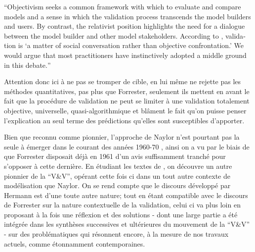 \foreignquote{english}{Objectivism seeks a common framework with which to evaluate and compare models and a sense in which the validation process transcends the model builders and users. By contrast, the relativist position highlights the need for a dialogue between the model builder and other model stakeholders. According to \autocite{Barlas1990}, validation is \enquote{a matter of social conversation rather than objective confrontation.} We would argue that most practitioners have instinctively adopted a middle ground in this debate.} \autocite[1098]{Kleindorfer1998}

Attention donc ici à ne pas se tromper de cible, \textcite[188]{Barlas1996} en lui même ne rejette pas les méthodes quantitatives, pas plus que Forrester, seulement ils mettent en avant le fait que la procédure de validation ne peut se limiter à une validation totalement objective, universelle, quasi-algorithmique et blâment le fait qu'on puisse penser l'explication au seul terme des prédictions qu'elles sont susceptibles d'apporter.





Bien que reconnu comme pionnier, l'approche de Naylor n'est pourtant pas la seule à émerger dans le courant des années 1960-70 \autocite{Balci1980}, ainsi on a vu par le biais de \autocite{Barlas1990} que Forrester disposait déjà en 1961 d'un avis suffisamment tranché pour s'opposer à cette dernière. En étudiant les textes de \textcite{Hermann1967}, on découvre un autre pionnier de la \enquote{V\&V}, opérant cette fois ci dans un tout autre contexte de modélisation que Naylor. On se rend compte que le discours développé par Hermann est d'une toute autre nature; tout en étant compatible avec le discours de Forrester sur la nature contextuelle de la validation, celui ci va plus loin en proposant à la fois une réflexion et des solutions - dont une large partie a été intégrée dans les synthèses successives et ultérieures du mouvement de la \enquote{V\&V} - sur des problématiques qui résonnent encore, à la mesure de nos travaux actuels, comme étonnamment contemporaines.
